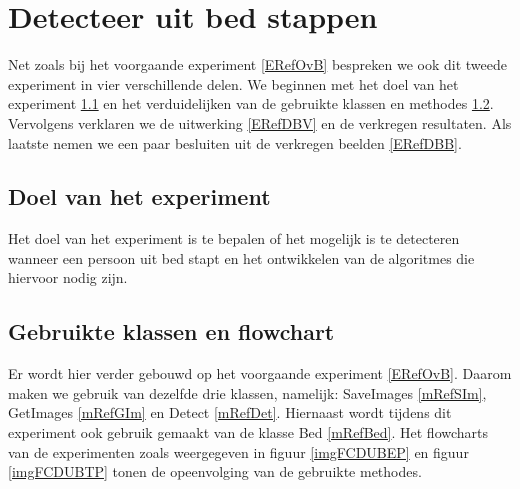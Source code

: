 \section{Detecteer uit bed stappen}
\label{ERefDUB}
Net zoals bij het voorgaande experiment \ref{ERefOvB} bespreken we ook dit tweede experiment in vier verschillende delen. We beginnen met het doel van het experiment \ref{ERefDBD} en het verduidelijken van de gebruikte klassen en methodes \ref{ERefDBK}. Vervolgens verklaren we de uitwerking \ref{ERefDBV} en de verkregen resultaten. Als laatste nemen we een paar besluiten uit de verkregen beelden \ref{ERefDBB}.

\subsection{Doel van het experiment}
\label{ERefDBD}
Het doel van het experiment is te bepalen of het mogelijk is te detecteren wanneer een persoon uit bed stapt en het ontwikkelen van de algoritmes die hiervoor nodig zijn.

\subsection{Gebruikte klassen en flowchart}
\label{ERefDBK}
Er wordt hier verder gebouwd op het voorgaande experiment \ref{ERefOvB}. Daarom maken we gebruik van dezelfde drie klassen, namelijk: SaveImages \ref{mRefSIm}, GetImages \ref{mRefGIm} en Detect \ref{mRefDet}. Hiernaast wordt tijdens dit experiment ook gebruik gemaakt van de klasse Bed \ref{mRefBed}. Het flowcharts van de experimenten zoals weergegeven in figuur \ref{imgFCDUBEP} en figuur \ref{imgFCDUBTP} tonen de opeenvolging van de gebruikte methodes.

